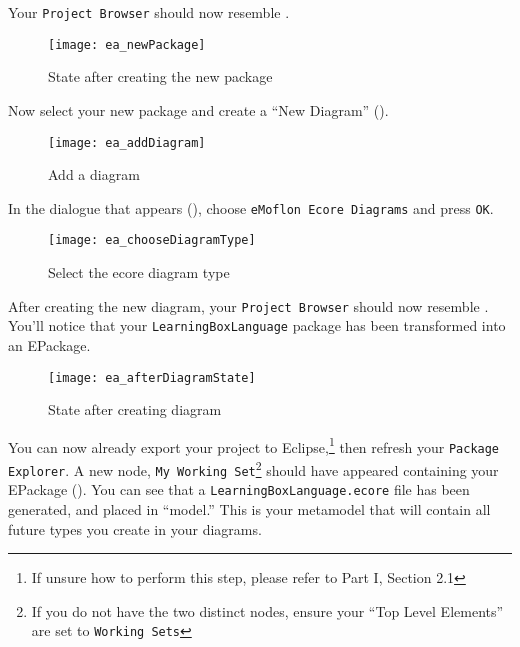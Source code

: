 \begin{stepbystep}
\vspace{0.5cm}

\item Your \texttt{Project Browser} should now resemble .

\vspace{0.5cm}

\begin{figure}[htbp]
	\centering
  \texttt{[image: ea\_newPackage]}
	\caption{State after creating the new package}
	\label{ea:newPackageComplete}
\end{figure}
\FloatBarrier

\vspace{0.5cm}

\item Now select your new package and create a ``New Diagram'' ().

\vspace{0.5cm}

\begin{figure}[htbp]
	\centering
  \texttt{[image: ea\_addDiagram]}
	\caption{Add a diagram}
	\label{ea:newDiagram}
\end{figure}
\FloatBarrier

\clearpage

\item In the dialogue that appears (), choose \texttt{eMoflon Ecore Diagrams} and press \texttt{OK}. 

\begin{figure}[htbp]
	\centering
  \texttt{[image: ea\_chooseDiagramType]}
	\caption{Select the ecore diagram type}
	\label{ea:diagramType}
\end{figure}
\FloatBarrier

 
\item After creating the new diagram, your  \texttt{Project Browser} should now resemble . You'll notice
that your \texttt{LearningBoxLanguage} package has been transformed into an EPackage.

\begin{figure}[htbp]
	\centering
  \texttt{[image: ea\_afterDiagramState]}
	\caption{State after creating diagram}
	\label{ea:diagramComplete}
\end{figure}
\FloatBarrier

\item You can now already export your project to Eclipse,\footnote{If unsure how to perform this step, please refer to Part I, Section
2.1} then refresh your \texttt{Package Explorer}. A new node, \texttt{My Working Set}\footnote{If you do not have the two distinct nodes, ensure your ``Top
Level Elements'' are set to \texttt{Working Sets}} should have appeared containing your EPackage (). You can see that a
\texttt{LearningBoxLanguage.ecore} file has been generated, and placed in ``model.'' This is your metamodel that will contain all future types you create in
your diagrams.


\end{stepbystep}
